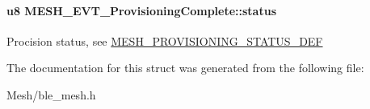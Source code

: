 \paragraph[{\texorpdfstring{status}{status}}]{\setlength{\rightskip}{0pt plus 5cm}u8 M\+E\+S\+H\+\_\+\+E\+V\+T\+\_\+\+Provisioning\+Complete\+::status}\hypertarget{struct_m_e_s_h___e_v_t___provisioning_complete_aa4bb0ce1638bf49a9e73efaa541c8176}{}\label{struct_m_e_s_h___e_v_t___provisioning_complete_aa4bb0ce1638bf49a9e73efaa541c8176}
Procision status, see \hyperlink{group___m_e_s_h___p_r_o_v_i_s_i_o_n_i_n_g___s_t_a_t_u_s___d_e_f}{M\+E\+S\+H\+\_\+\+P\+R\+O\+V\+I\+S\+I\+O\+N\+I\+N\+G\+\_\+\+S\+T\+A\+T\+U\+S\+\_\+\+D\+EF} 

The documentation for this struct was generated from the following file\+:\begin{DoxyCompactItemize}
\item 
Mesh/ble\+\_\+mesh.\+h\end{DoxyCompactItemize}
